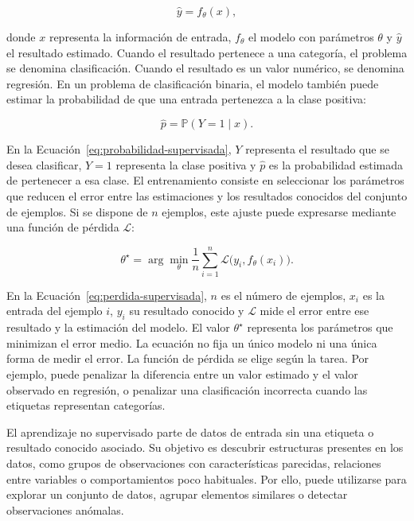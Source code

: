 \begin{equation}
\hat{y}=f_{\theta}(x),
\label{eq:prediccion-supervisada}
\end{equation}

donde $x$ representa la información de entrada, $f_{\theta}$ el modelo con parámetros $\theta$ y $\hat{y}$ el resultado estimado. Cuando el resultado pertenece a una categoría, el problema se denomina clasificación. Cuando el resultado es un valor numérico, se denomina regresión. En un problema de clasificación binaria, el modelo también puede estimar la probabilidad de que una entrada pertenezca a la clase positiva:

\begin{equation}
\hat{p}=\mathbb{P}(Y=1\mid x).
\label{eq:probabilidad-supervisada}
\end{equation}

En la Ecuación~\ref{eq:probabilidad-supervisada}, $Y$ representa el resultado que se desea clasificar, $Y=1$ representa la clase positiva y $\hat{p}$ es la probabilidad estimada de pertenecer a esa clase. El entrenamiento consiste en seleccionar los parámetros que reducen el error entre las estimaciones y los resultados conocidos del conjunto de ejemplos. Si se dispone de $n$ ejemplos, este ajuste puede expresarse mediante una función de pérdida $\mathcal{L}$:

\begin{equation}
\theta^\star=\arg\min_{\theta}\frac{1}{n}\sum_{i=1}^{n}\mathcal{L}\bigl(y_i,f_{\theta}(x_i)\bigr).
\label{eq:perdida-supervisada}
\end{equation}

En la Ecuación~\ref{eq:perdida-supervisada}, $n$ es el número de ejemplos, $x_i$ es la entrada del ejemplo $i$, $y_i$ su resultado conocido y $\mathcal{L}$ mide el error entre ese resultado y la estimación del modelo. El valor $\theta^\star$ representa los parámetros que minimizan el error medio. La ecuación no fija un único modelo ni una única forma de medir el error. La función de pérdida se elige según la tarea. Por ejemplo, puede penalizar la diferencia entre un valor estimado y el valor observado en regresión, o penalizar una clasificación incorrecta cuando las etiquetas representan categorías.

El aprendizaje no supervisado parte de datos de entrada sin una etiqueta o resultado conocido asociado. Su objetivo es descubrir estructuras presentes en los datos, como grupos de observaciones con características parecidas, relaciones entre variables o comportamientos poco habituales. Por ello, puede utilizarse para explorar un conjunto de datos, agrupar elementos similares o detectar observaciones anómalas.

